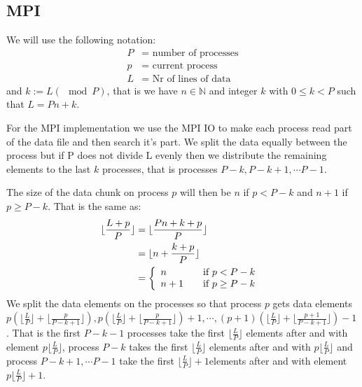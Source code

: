 \documentclass[a4paper,10pt]{article}
\begin{document}
\subsection{MPI}


  We will use the following notation:
  \begin{align*}
    P &= \text{ number of processes} \\
    p &= \text{ current process}  \\
    L &= \text{ Nr of lines of data } 
  \end{align*}
  and $k:= L (\mod P)$, that is we have $n\in \mathbb{N}$ and integer $k$ with $0\leq k < P$
  such that $L = Pn+k$.

  For the MPI implementation we use the MPI IO to make each process read part of the data file
  and then search it's part.  We split the data equally between the process but if
  P does not divide L evenly then we distribute the remaining elements to the last $k$ processes,
  that is processes $P-k,P-k+1,\cdots P-1$.
  
  The size of the data chunk on process $p$ will then be $n$ if $p<P-k$ and $n+1$ if $p\geq P-k$.
  That is the same as:
  \begin{align*}
    \lfloor \frac{L+p}{P}\rfloor  &= \lfloor \frac{Pn+k+p}{P}\rfloor  \\
                                  &= \lfloor n+\frac{k+p}{P}\rfloor   \\
                                  &=                                  
                                  \left\{
                                    \begin{array}{l l}
                                       n   & \quad \text{if $p<P-k$ }\\
                                       n+1 & \quad \text{if $p\geq P-k$}\\
                                     \end{array} \right.
  \end{align*}
  We split the data elements on the processes so that process $p$ 
  gets data elements 
  $p\left( \lfloor \frac{L}{P} \rfloor + \lfloor \frac{p}{P-k+1} \rfloor \right),
   p\left( \lfloor \frac{L}{P} \rfloor + \lfloor \frac{p}{P-k+1} \rfloor \right)+1, \cdots,
   (p+1)\left( \lfloor \frac{L}{P} \rfloor + \lfloor \frac{p+1}{P-k+1} \rfloor \right)-1
  $.
  That is the first $P-k-1$ processes take the first $\lfloor \frac{L}{P} \rfloor$ elements
  after and with element $ p \lfloor \frac{L}{P} \rfloor $, process $P-k$ takes the first
  $\lfloor \frac{L}{P} \rfloor$ elements after and with $ p \lfloor \frac{L}{P} \rfloor $
  and process $P-k+1,\cdots P-1$ take the first $\lfloor \frac{L}{P} \rfloor+1$elements after and
  with element $ p \lfloor \frac{L}{P} \rfloor +1 $.
\end{document}
